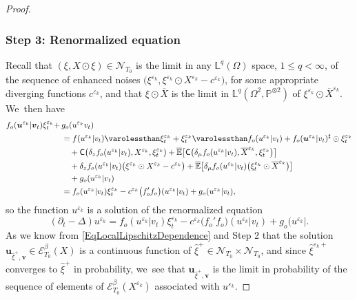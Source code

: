 \documentclass[10pt]{amsart}
\theoremstyle{definition}
\let\epsilon\varepsilon
\newcommand\bbE{\mathbb{E}}
\newcommand{\mcE}{\mathcal{E}}
\newcommand{\mcN}{\mathcal{N}}
\newcommand{\bbL}{\mathbb{L}}
\newcommand{\bbP}{\mathbb{P}}
\newcommand{\bsu}{\boldsymbol{u}}
\newcommand{\bsv}{\boldsymbol{v}}
\begin{document}
\begin{proof}
\subsubsection*{Step 3: Renormalized equation} Recall that $(\xi,X\odot\xi)\in\boldsymbol{\mcN}_{T_0}$ is the limit in any $\bbL^q(\Omega)$ space, $1\leq q<\infty$, of the sequence of enhanced noises $\bigl(\xi^{\epsilon_k}, \xi^{\epsilon_k}\odot X^{\epsilon_k} - c^{\epsilon_k}\bigr)$, for some appropriate diverging functions $c^{\epsilon_k}$, and that $\xi\odot\overline X$ is the limit in $\bbL^q(\Omega^2,\bbP^{\otimes 2})$ of $\xi^{\epsilon_k}\odot \overline{X}^{\epsilon_k} $. We~then have
\begin{align*}
f_o(\bsu^{\epsilon_k} \vert \bsv_t)\xi^{\epsilon_k}_t +\,& g_o(u^{\epsilon_k} v_t) \\
&= f(u^{\epsilon_k} \vert v_t) \varolessthan \xi^{\epsilon_k}_t + \xi^{\epsilon_k}_t \varolessthan f_o(u^{\epsilon_k} \vert v_t) + f_o(\bsu^{\epsilon_k} \vert v_t)^\sharp\odot \xi^{\epsilon_k}_t
\\
&\quad+ \mathsf{C} \bigl(\delta_z f_o(u^{\epsilon_k} \vert v_t), X^{\epsilon_k},\xi^{\epsilon_k}_t) + \overline{\bbE}\bigl[ \mathsf{C} \bigl(\delta_\mu f_o(u^{\epsilon_k} \vert v_t), \overline{X}^{\epsilon_k},\xi^{\epsilon_k}_t \bigr)\bigr]
\\
&\quad+ \delta_z f_o(u^{\epsilon_k} \vert v_t) \bigl(\xi^{\epsilon_k}\odot X^{\epsilon_k} - c^{\epsilon_k}\bigr) + \overline{\bbE}\bigl[ \delta_\mu f_o(u^{\epsilon_k} \vert v_t) \bigl(\xi^{\epsilon_k}_t \odot \overline{X}^{\epsilon_k} \bigr) \bigr]
\\
&\quad+ g_o(u^{\epsilon_k} \vert v_t)
\\
&= f_o(u^{\epsilon_k} \vert v_t) \xi^{\epsilon_k}_t - c^{\epsilon_k} \bigl(f_o'f_o\bigr)(u^{\epsilon_k} \vert v_t) + g_o(u^{\epsilon_k} \vert v_t),
\end{align*}
so the function $u^{\epsilon_k}$ is a solution of the renormalized equation
\[
(\partial_t-\Delta)u^{\epsilon_k} = f_o(u^{\epsilon_k} \vert v_t) \xi^{\epsilon_k}_t - c^{\epsilon_k} \bigl(f_o'f_o\bigr)(u^{\epsilon_k} \vert v_t) + g_o(u^{\epsilon_k} \vert.
\]
As we know from \eqref{EqLocalLipschitzDependence} and Step 2 that the solution $\bsu_{\widehat\xi^+,\bsv}\in \mcE^\beta_{T_0}(X)$ is a continuous function of $\widehat\xi^+\in\boldsymbol{\mcN}_{T_0}\times\boldsymbol{\mcN}_{T_0}$, and since $\widehat\xi^{\epsilon_k+}$ converges to $\widehat\xi^+$ in probability, we~see that $\bsu_{\widehat\xi^+,\bsv}$ is the limit in probability of the sequence of elements of $\mcE^\beta_{T_0}(X^{\epsilon_k})$ associated with $u^{\epsilon_k}$.
\end{proof}
\end{document}
